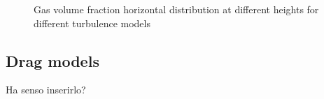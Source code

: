 \documentclass[11pt,a4paper]{article}
\begin{document}
\begin{figure}[H]
    \centering
    \caption[]{Gas volume fraction horizontal distribution at different heights for different turbulence models}
    \label{fig:alpha_turbmodel}
\end{figure}

\subsection{Drag models}
\label{sub:drag_models}
{\color{red} Ha senso inserirlo?}
\end{document}
